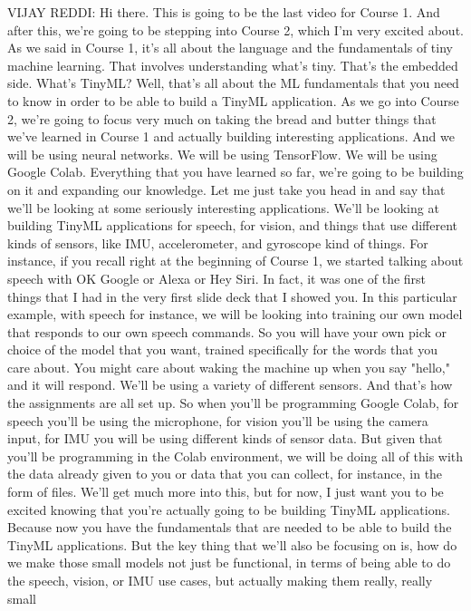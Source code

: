 VIJAY REDDI: Hi there.
This is going to be the last video for Course 1.
And after this, we're going to be stepping into Course 2, which
I'm very excited about.
As we said in Course 1, it's all about the language and the fundamentals
of tiny machine learning.
That involves understanding what's tiny.
That's the embedded side.
What's TinyML?
Well, that's all about the ML fundamentals
that you need to know in order to be able to build a TinyML application.
As we go into Course 2, we're going to focus very much
on taking the bread and butter things that we've learned in Course 1
and actually building interesting applications.
And we will be using neural networks.
We will be using TensorFlow.
We will be using Google Colab.
Everything that you have learned so far, we're going to be building on it
and expanding our knowledge.
Let me just take you head in and say that we'll
be looking at some seriously interesting applications.
We'll be looking at building TinyML applications for speech, for vision,
and things that use different kinds of sensors,
like IMU, accelerometer, and gyroscope kind of things.
For instance, if you recall right at the beginning of Course 1,
we started talking about speech with OK Google or Alexa or Hey Siri.
In fact, it was one of the first things that I had in the very first slide deck
that I showed you.
In this particular example, with speech for instance,
we will be looking into training our own model that
responds to our own speech commands.
So you will have your own pick or choice of the model
that you want, trained specifically for the words that you care about.
You might care about waking the machine up when you say "hello,"
and it will respond.
We'll be using a variety of different sensors.
And that's how the assignments are all set up.
So when you'll be programming Google Colab,
for speech you'll be using the microphone,
for vision you'll be using the camera input,
for IMU you will be using different kinds of sensor data.
But given that you'll be programming in the Colab environment,
we will be doing all of this with the data already given to you or data
that you can collect, for instance, in the form of files.
We'll get much more into this, but for now, I just
want you to be excited knowing that you're actually going
to be building TinyML applications.
Because now you have the fundamentals that
are needed to be able to build the TinyML applications.
But the key thing that we'll also be focusing on
is, how do we make those small models not just be functional,
in terms of being able to do the speech, vision, or IMU use cases,
but actually making them really, really small
